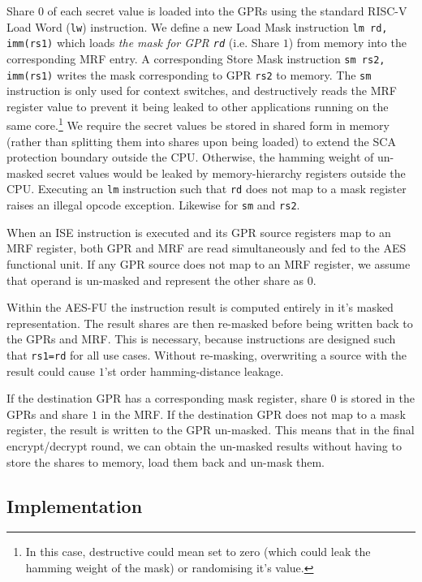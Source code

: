 Share $0$ of each secret value is loaded into the GPRs using the
standard RISC-V Load Word ({\tt lw}) instruction.
We define a new Load Mask instruction {\tt lm rd, imm(rs1)} which
loads {\em the mask for GPR {\tt rd}}
(i.e. Share $1$)
from memory into the corresponding MRF entry.
A corresponding Store Mask instruction {\tt sm rs2, imm(rs1)} writes
the mask corresponding to GPR {\tt rs2} to memory.
The {\tt sm} instruction is only used for context switches, and
destructively reads the MRF register value to prevent it being
leaked to other applications running on the same core.\footnote{
    In this case, destructive could mean set to zero (which could
    leak the hamming weight of the mask) or randomising it's value.}
We require the secret values be stored in shared form in memory
(rather than splitting them into shares upon being loaded)
to extend the SCA protection boundary outside the CPU.
Otherwise, the hamming weight of un-masked secret values would be
leaked by memory-hierarchy registers outside the CPU.
Executing an {\tt lm} instruction such that {\tt rd} does not map to
a mask register raises an illegal opcode exception.
Likewise for {\tt sm} and {\tt rs2}.

When an ISE instruction is executed and its GPR source
registers map to an MRF register, both GPR and MRF are
read simultaneously and fed to the AES functional unit.
If any GPR source does not map to an MRF register, we assume that
operand is un-masked and represent the other share as $0$.

Within the AES-FU the instruction result is computed entirely in it's
masked representation.
The result shares are then re-masked before being written back to the
GPRs and MRF.
This is necessary, because  instructions are designed
such that {\tt rs1=rd} for all use cases.
Without re-masking, overwriting a source with the result could cause 
$1$'st order hamming-distance leakage.

If the destination GPR has a corresponding
mask register, share $0$ is stored in the GPRs and share $1$ in the MRF.
If the destination GPR does not map to a mask register, the result is written
to the GPR un-masked.
This means that in the final encrypt/decrypt round, we can obtain
the un-masked results without having to store the shares to memory,
load them back and un-mask them.

\subsection{Implementation}

